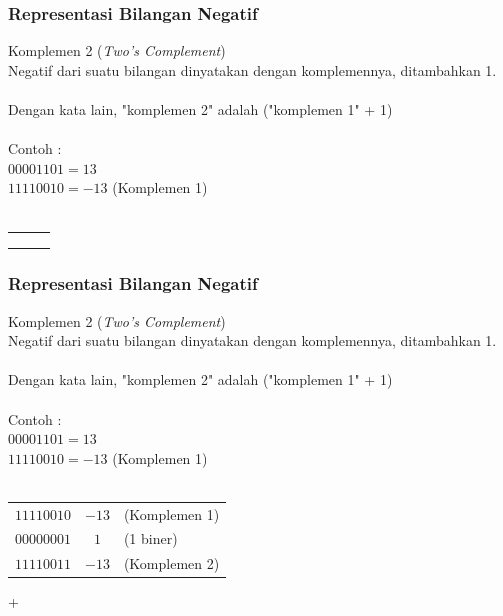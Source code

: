 \documentclass{beamer}
\begin{document}

\begin{frame}
\frametitle{Representasi Bilangan Negatif}
Komplemen 2 (\textit{Two's Complement})
\\Negatif dari suatu bilangan dinyatakan dengan komplemennya, ditambahkan 1.
\\\ \\Dengan kata lain, "komplemen 2" adalah ("komplemen 1" + 1)
\\\ \\Contoh :
\\$00001101 = 13$
\\$11110010 = -13$ (Komplemen 1)
\\\ \\\begin{tabular}{rcl}
	& & \\
	& & \\
	& & \\
\end{tabular} 


\end{frame}


\begin{frame}
\frametitle{Representasi Bilangan Negatif}
Komplemen 2 (\textit{Two's Complement})
\\Negatif dari suatu bilangan dinyatakan dengan komplemennya, ditambahkan 1.
\\\ \\Dengan kata lain, "komplemen 2" adalah ("komplemen 1" + 1)
\\\ \\Contoh :
\\$00001101 = 13$
\\$11110010 = -13$ (Komplemen 1)
\\\ \\\begin{tabular}{rcl}
	$11110010$ & $-13$ & (Komplemen 1)\\
	$00000001$ & $1$ & (1 biner)\\
	\hline
	$11110011$ & $-13$ & (Komplemen 2)\\
\end{tabular} +

\end{frame}

\end{document}
